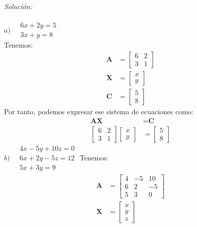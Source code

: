 \documentclass[12pt]{article}
\newenvironment{sol}
    {\emph{Solución:}
    }
    {
    }
\begin{document}
\begin{sol} \\ \\
$
a) \quad 
\begin{matrix}
6x+2y=5 \\
3x+y=8
\end{matrix}
$ \\
Tenemos:
\begin{align*}
\textbf{A} &=
\begin{bmatrix}
6 & 2 \\
3 & 1 
\end{bmatrix} 
\\
\textbf{X} &=
\begin{bmatrix}
x \\
y
\end{bmatrix}
\\
\textbf{C} &= 
\begin{bmatrix}
5\\
8
\end{bmatrix}
\end{align*}
Por tanto, podemos expresar ese sistema de ecuaciones como: 
\begin{align*}
\textbf{AX} &= \textbf{C} \\
\begin{bmatrix}
6 & 2 \\
3 & 1 
\end{bmatrix} 
\begin{bmatrix}
x \\
y
\end{bmatrix}
&=
\begin{bmatrix}
5\\
8
\end{bmatrix}
\end{align*}
$b)\quad
\begin{matrix}
4x-5y+10z =0 \\
6x+2y-5z=12 \\
5x+3y = 9
\end{matrix}$
Tenemos:
\begin{align*}
\textbf{A} &=
\begin{bmatrix}
4 & -5 & 10 \\
6 & 2 & -5 \\
5 & 3 & 0 
\end{bmatrix} 
\\
\textbf{X} &=
\begin{bmatrix}
x \\
y\\
z
\end{bmatrix}

\end{align*}
\end{sol}
\end{document}
